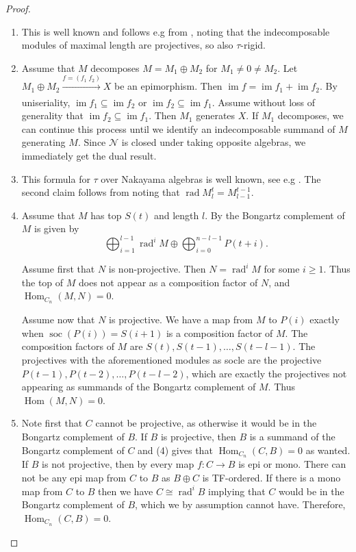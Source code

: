 \documentclass[11pt]{amsart}
\DeclareMathOperator{\Hom}{\mathrm{Hom}}
\DeclareMathOperator{\im}{\mathrm{im}}
\DeclareMathOperator{\soc}{\mathrm{soc}}
\DeclareMathOperator{\rad}{\mathrm{rad}}
\theoremstyle{definition}
\begin{document}
\begin{proof}
    \begin{enumerate}
        \item This is well known and follows e.g from \cite[Prop. 2.5]{Adachi2016}, noting that the indecomposable modules of maximal length are projectives, so also $\tau$-rigid.
        \item Assume that $M$ decomposes $M = M_1 \oplus M_2$ for $M_1 \neq 0 \neq M_2$. Let $M_1 \oplus M_2 \xrightarrow[]{f = (f_1 \; f_2)} X$ be an epimorphism. Then $\im f = \im f_1 + \im f_2$. By uniseriality, $\im f_1 \subseteq \im f_2$ or $\im f_2 \subseteq \im f_1$. Assume without loss of generality that $\im f_2 \subseteq \im f_1$. Then $M_1$ generates $X$. If $M_1$ decomposes, we can continue this process until we identify an indecomposable summand of $M$ generating $M$. Since $\mathcal{N}$ is closed under taking opposite algebras, we immediately get the dual result.
        \item This formula for $\tau$ over Nakayama algebras is well known, see e.g \cite[Thm. V.4.1]{assem_skowronski_simson_2006}. The second claim follows from noting that $\rad M^t_l = M^{t-1}_{l-1}$.
        \item Assume that $M$ has top $S(t)$ and length $l$. By \cite[Prop. 4.9]{bkt} the Bongartz complement of $M$ is given by \[\bigoplus_{i = 1}^{l-1} \rad^i M \oplus \bigoplus_{i = 0}^{n-l-1} P(t+i).\]

        Assume first that $N$ is non-projective. Then $N = \rad^i M$ for some $i\geq 1$. Thus the top of $M$ does not appear as a composition factor of $N$, and $\Hom_{C_n}(M,N) = 0$.

        Assume now that $N$ is projective. We have a map from $M$ to $P(i)$ exactly when $\soc(P(i)) = S(i+1)$ is a composition factor of $M$. The composition factors of $M$ are $S(t),S(t-1),\dots, S(t-l-1)$. The projectives with the aforementioned modules as socle are the projective $P(t-1),P(t-2),\dots,P(t-l-2)$, which are exactly the projectives not appearing as summands of the Bongartz complement of $M$. Thus $\Hom(M,N) = 0$.
        \item Note first that $C$ cannot be projective, as otherwise it would be in the Bongartz complement of $B$. If $B$ is projective, then $B$ is a summand of the Bongartz complement of $C$ and (4) gives that $\Hom_{C_n}(C,B) = 0$ as wanted. If $B$ is not projective, then by \cite[Lem. 5.4]{bkt} every map $f\colon C \to B$ is epi or mono. There can not be any epi map from $C$ to $B$ as $B \oplus C$ is TF-ordered. If there is a mono map from $C$ to $B$ then we have $C \cong \rad^iB$ implying that $C$ would be in the Bongartz complement of $B$, which we by assumption cannot have. Therefore, $\Hom_{C_n}(C,B) = 0$.
    \end{enumerate}
\end{proof}
\end{document}
